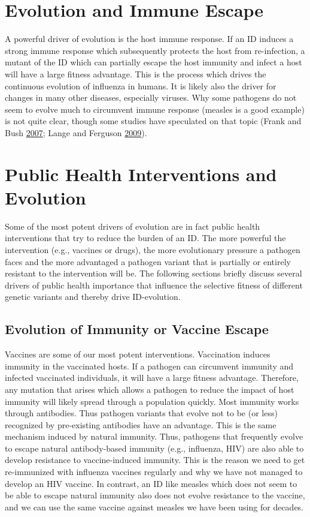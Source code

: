 \documentclass[]{book}
\theoremstyle{definition}
\theoremstyle{definition}
\theoremstyle{definition}
\theoremstyle{remark}
\begin{document}
\section{Evolution and Immune Escape}\label{evolution-and-immune-escape}

A powerful driver of evolution is the host immune response. If an ID
induces a strong immune response which subsequently protects the host
from re-infection, a mutant of the ID which can partially escape the
host immunity and infect a host will have a large fitness advantage.
This is the process which drives the continuous evolution of influenza
in humans. It is likely also the driver for changes in many other
diseases, especially viruses. Why some pathogens do not seem to evolve
much to circumvent immune response (measles is a good example) is not
quite clear, though some studies have speculated on that topic (Frank
and Bush \protect\hyperlink{ref-frank07}{2007}; Lange and Ferguson
\protect\hyperlink{ref-lange09}{2009}).

\section{Public Health Interventions and
Evolution}\label{public-health-interventions-and-evolution}

Some of the most potent drivers of evolution are in fact public health
interventions that try to reduce the burden of an ID. The more powerful
the intervention (e.g., vaccines or drugs), the more evolutionary
pressure a pathogen faces and the more advantaged a pathogen variant
that is partially or entirely resistant to the intervention will be. The
following sections briefly discuss several drivers of public health
importance that influence the selective fitness of different genetic
variants and thereby drive ID-evolution.

\subsection{Evolution of Immunity or Vaccine
Escape}\label{evolution-of-immunity-or-vaccine-escape}

Vaccines are some of our most potent interventions. Vaccination induces
immunity in the vaccinated hosts. If a pathogen can circumvent immunity
and infected vaccinated individuals, it will have a large fitness
advantage. Therefore, any mutation that arises which allows a pathogen
to reduce the impact of host immunity will likely spread through a
population quickly. Most immunity works through antibodies. Thus
pathogen variants that evolve not to be (or less) recognized by
pre-existing antibodies have an advantage. This is the same mechanism
induced by natural immunity. Thus, pathogens that frequently evolve to
escape natural antibody-based immunity (e.g., influenza, HIV) are also
able to develop resistance to vaccine-induced immunity. This is the
reason we need to get re-immunized with influenza vaccines regularly and
why we have not managed to develop an HIV vaccine. In contrast, an ID
like measles which does not seem to be able to escape natural immunity
also does not evolve resistance to the vaccine, and we can use the same
vaccine against measles we have been using for decades.
\end{document}
